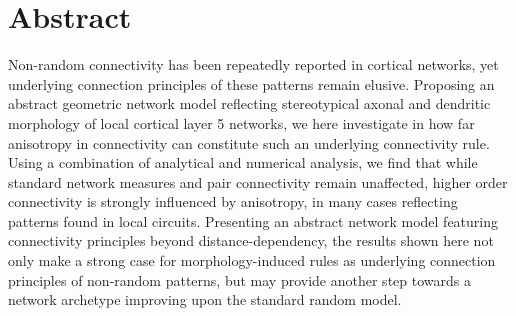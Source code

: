 \begingroup
\let\clearpage\relax
\let\cleardoublepage\relax
\let\cleardoublepage\relax

\chapter*{Abstract}

Non-random connectivity has been repeatedly reported in cortical
networks, yet underlying connection principles of these patterns
remain elusive. Proposing an abstract geometric network model
reflecting stereotypical axonal and dendritic morphology of local
cortical layer 5 networks, we here investigate in how far anisotropy
in connectivity can constitute such an underlying connectivity
rule. Using a combination of analytical and numerical analysis, we
find that while standard network measures and pair connectivity remain
unaffected, higher order connectivity is strongly influenced by
anisotropy, in many cases reflecting patterns found in local
circuits. Presenting an abstract network model featuring connectivity
principles beyond distance-dependency, the results shown here not only
make a strong case for morphology-induced rules as underlying
connection principles of non-random patterns, but may provide another
step towards a network archetype improving upon the standard random
model.











\endgroup			

\vfill

